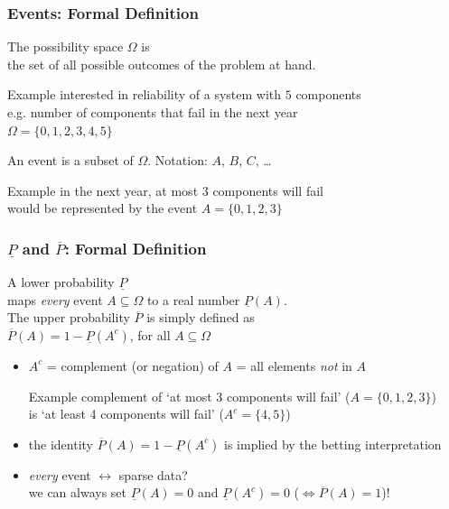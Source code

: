 \documentclass{beamer}
\newcommand{\lpr}{\underline{P}}
\newcommand{\upr}{\overline{P}}
\begin{document}
\begin{frame}
  \frametitle{Events: Formal Definition}
  \begin{definition}
    The \alert{possibility space} $\Omega$ is \\
    the set of all possible outcomes of the problem at hand.
  \end{definition}
  \vspace*{-1ex}
  \begin{exampleblock}{Example}
    interested in reliability of a system with $5$ components \\
    e.g. number of components that fail in the next year \\
    $\Omega=\{0,1,2,3,4,5\}$
  \end{exampleblock}
  \begin{definition}
    An \alert{event} is a subset of $\Omega$.
    \hspace{2em}
    Notation: $A$, $B$, $C$, \dots
  \end{definition} 
  \vspace*{-1ex}
  \begin{exampleblock}{Example}
    in the next year, at most 3 components will fail
    \\
    would be represented by the event $A=\{0,1,2,3\}$
  \end{exampleblock}
\end{frame}

\begin{frame}
  \frametitle{$\lpr$ and $\upr$: Formal Definition}
  \begin{definition}
    A \alert{lower probability} $\lpr$
    \\
    maps
    \textit{every}
    event $A\subseteq\Omega$ to a real number $\lpr(A)$.
    \\[1ex]
    The \alert{upper probability} $\upr$ is simply defined as \\
    $\upr(A)=1-\lpr(A^c)$, for all $A\subseteq\Omega$
  \end{definition}
  \begin{itemize}
  \item $A^c$ = \alert{complement} (or \alert{negation}) of $A$ = all elements {\it not} in $A$
  \begin{exampleblock}{Example}
    complement of `at most 3 components will fail' ($A=\{0,1,2,3\}$)
    \\ is `at least 4 components will fail' ($A^c=\{4,5\}$)
  \end{exampleblock}
  \item {\small the identity $\upr(A)=1-\lpr(A^c)$ is implied
    by the betting interpretation }%
  \item {\small \textit{every} event $\leftrightarrow$ sparse data? \\
    we can always set $\lpr(A)=0$ and $\lpr(A^c)=0$ ($\iff\upr(A)=1$)!}
  \end{itemize}
\end{frame}
\end{document}
